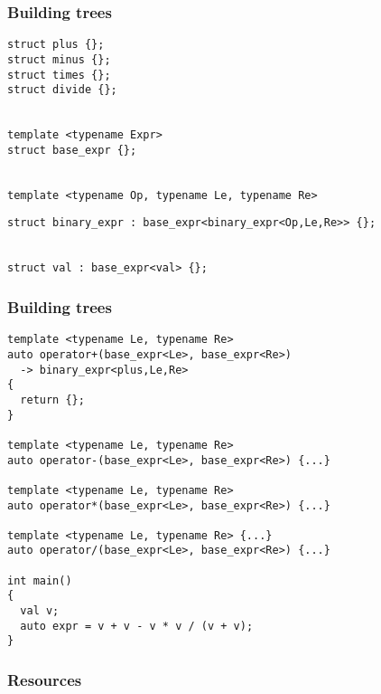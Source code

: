 \documentclass[14pt,a4paper,dvipsnames,usenames]{beamer}
\begin{document}
\begin{frame}[fragile]
  \frametitle{Building trees}

  \begin{lstlisting}[basicstyle=\ttfamily\fontsize{8pt}{8pt}\selectfont]
struct plus {};
struct minus {};
struct times {};
struct divide {};


template <typename Expr>
struct base_expr {};


template <typename Op, typename Le, typename Re>
  \end{lstlisting}
  \vspace*{-.4cm}
  \begin{lstlisting}[basicstyle=\ttfamily\fontsize{8pt}{8pt}\selectfont,morekeywords={base_expr,Op,Le,Re}]
struct binary_expr : base_expr<binary_expr<Op,Le,Re>> {};


struct val : base_expr<val> {};
  \end{lstlisting}
  
\end{frame}

\begin{frame}[fragile]
  \frametitle{Building trees}

  \begin{lstlisting}[basicstyle=\ttfamily\fontsize{8pt}{8pt}\selectfont,morekeywords={base_expr,binary_expr,val,plus}]
template <typename Le, typename Re>
auto operator+(base_expr<Le>, base_expr<Re>)
  -> binary_expr<plus,Le,Re>
{
  return {};
}

template <typename Le, typename Re>
auto operator-(base_expr<Le>, base_expr<Re>) {...}

template <typename Le, typename Re>
auto operator*(base_expr<Le>, base_expr<Re>) {...}

template <typename Le, typename Re> {...}
auto operator/(base_expr<Le>, base_expr<Re>) {...}

int main()
{
  val v;
  auto expr = v + v - v * v / (v + v);
}
  \end{lstlisting}
  
\end{frame}

\begin{frame}
  \frametitle{Resources}
  
  {\footnotesize
    }
\end{frame}
  
\end{document}
